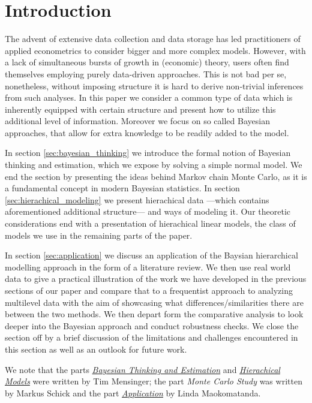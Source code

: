 \section{Introduction}

The advent of extensive data collection and data storage has led practitioners of applied econometrics to consider bigger and more complex models.
However, with a lack of simultaneous bursts of growth in (economic) theory, users often find themselves employing purely data-driven approaches.
This is not bad per se, nonetheless, without imposing structure it is hard to derive non-trivial inferences from such analyses.
In this paper we consider a common type of data which is inherently equipped with certain structure and present how to utilize this additional level of information.
Moreover we focus on so called Bayesian approaches, that allow for extra knowledge to be readily added to the model.

In section \ref{sec:bayesian_thinking} we introduce the formal notion of Bayesian thinking and estimation, which we expose by solving a simple normal model.
We end the section by presenting the ideas behind Markov chain Monte Carlo, as it is a fundamental concept in modern Bayesian statistics. In section \ref{sec:hierachical_modeling} we present hierachical data ---which contains aforementioned additional structure--- and ways of modeling it.
Our theoretic considerations end with a presentation of hierachical linear models, the class of models we use in the remaining parts of the paper.

In section \ref{sec:application} we discuss an application of the Baysian hierarchical modelling approach in the form of a literature review. We then use real world data to give a practical illustration of the work we have developed in the previous sections of our paper and compare that to a frequentist approach to analyzing multilevel data with the aim of showcasing what differences/similarities there are between the two methods. We then depart form the comparative analysis to look deeper into the Bayesian approach and conduct robustness checks. We close the section off by a brief discussion of the limitations and challenges encountered in this section as well as an outlook for future work.

We note that the parts \hyperref[sec:bayesian_thinking]{\emph{Bayesian Thinking and Estimation}} and \hyperref[sec:hierachical_modeling]{\emph{Hierachical Models}} were written by Tim Mensinger; the part \emph{Monte Carlo Study} was written by Markus Schick and the part \hyperref[sec:application]{\emph{Application}} by Linda Maokomatanda.
